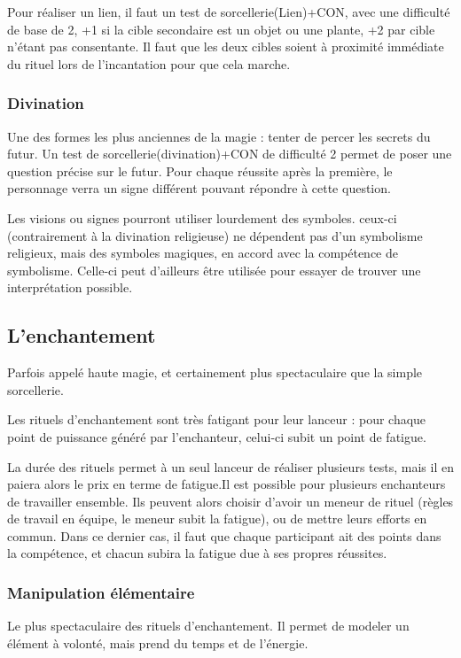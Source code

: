 \documentclass[10pt,a4paper,twocolumn]{book}
\begin{document}
Pour réaliser un lien, il faut un test de sorcellerie(Lien)+CON, avec une difficulté de base de 2, +1 si la cible secondaire est un objet ou une plante, +2 par cible n'étant pas consentante. Il faut que les deux cibles soient à proximité immédiate du rituel lors de l'incantation pour que cela marche.
\subsubsection{Divination}
Une des formes les plus anciennes de la magie : tenter de percer les secrets du futur. Un test de sorcellerie(divination)+CON de difficulté 2 permet de poser une question précise sur le futur. Pour chaque réussite après la première, le personnage verra un signe différent pouvant répondre à cette question.

Les visions ou signes pourront utiliser lourdement des symboles. ceux-ci (contrairement à la divination religieuse) ne dépendent pas d'un symbolisme religieux, mais des symboles magiques, en accord avec la compétence de symbolisme. Celle-ci peut d'ailleurs être utilisée pour essayer de trouver une interprétation possible.
\subsection{L'enchantement}
Parfois appelé haute magie, et certainement plus spectaculaire que la simple sorcellerie.

Les rituels d'enchantement sont très fatigant pour leur lanceur : pour chaque point de puissance généré par l'enchanteur, celui-ci subit un point de fatigue.

La durée des rituels permet à un seul lanceur de réaliser plusieurs tests, mais il en paiera alors le prix en terme de fatigue.Il est possible pour plusieurs enchanteurs de travailler ensemble. Ils peuvent alors choisir d'avoir un meneur de rituel (règles de travail en équipe, le meneur subit la fatigue), ou de mettre leurs efforts en commun. Dans ce dernier cas, il faut que chaque participant ait des points dans la compétence, et chacun subira la fatigue due à ses propres réussites.
\subsubsection{Manipulation élémentaire}
Le plus spectaculaire des rituels d'enchantement. Il permet de modeler un élément à volonté, mais prend du temps et de l'énergie.
\end{document}
